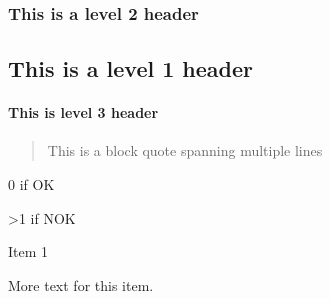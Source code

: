 \begin{DoxyPre}\end{DoxyPre}



\begin{DoxyPre}\subsubsection*{This is a level 2 header
}\end{DoxyPre}



\begin{DoxyPre}\end{DoxyPre}



\begin{DoxyPre}\subsection*{This is a level 1 header}\end{DoxyPre}



\begin{DoxyPre}\end{DoxyPre}



\begin{DoxyPre}\paragraph*{This is level 3 header}\end{DoxyPre}



\begin{DoxyPre}\end{DoxyPre}



\begin{DoxyPre}\begin{quotation}
This is a block quote
spanning multiple lines

\end{quotation}
\end{DoxyPre}



\begin{DoxyPre}0  if OK\par
>1 if NOK\end{DoxyPre}



\begin{DoxyPre}
\begin{DoxyItemize}
\item Item 1

More text for this item.
\end{DoxyItemize}\end{DoxyPre}



